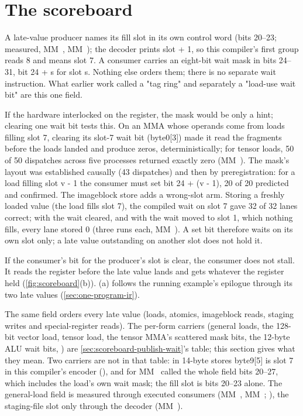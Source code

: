 \section{The scoreboard}\label{sec:scoreboard}

A late-value producer names its fill slot in its own control word (bits 20–23; measured, MM~, MM~); the decoder prints slot + 1, so this compiler's first group reads 8 and means slot 7. A consumer carries
an eight-bit wait mask in bits 24–31, bit 24 + s for slot s. Nothing else orders them; there is no separate wait instruction. What earlier work called a "tag ring" and separately a
"load-use wait bit" are this one field.

If the hardware interlocked on the register, the mask would be only a hint; clearing one wait bit tests this. On an MMA whose operands come from loads filling slot 7, clearing its slot-7 wait bit
(byte0{[}3{]}) made it read the fragments before the loads landed and produce zeros, deterministically; for tensor loads, 50
of 50 dispatches across five processes returned exactly zero (MM~). The mask's layout was established causally (43
dispatches) and then by preregistration: for a load filling slot v - 1 the consumer must set bit 24 + (v - 1), 20 of 20
predicted and confirmed. The imageblock store adds a wrong-slot arm. Storing a freshly loaded value (the load fills slot
7), the compiled wait on slot 7 gave 32 of 32 lanes correct; with the wait cleared, and with the wait moved to slot 1,
which nothing fills, every lane stored 0 (three runs each, MM~). A set bit therefore waits on its own slot only;
a late value outstanding on another slot does not hold it.

If the consumer's bit for the producer's slot is clear, the consumer does not stall. It reads the
register before the late value lands and gets whatever the register held (\cref{fig:scoreboard}(b)).
(a) follows the running example's epilogue through its two late values (\cref{sec:one-program-ir}).



The same field orders every late value (loads, atomics, imageblock reads, staging writes and special-register reads). The per-form carriers (general loads, the 128-bit vector load, tensor load, the tensor MMA's
scattered mask bits, the 12-byte ALU wait bits, ) are \cref{sec:scoreboard-publish-wait}'s table; this section
gives what they mean. Two carriers are not in that table: in 14-byte stores byte9{[}5{]} is slot 7 in this compiler's encoder
(), and for  MM~ called the whole field bits 20–27, which includes the
load's own wait mask; the fill slot is bits 20–23 alone. The general-load field is measured through executed consumers
(MM~, MM~;  ), the staging-file slot only through the decoder (MM~).

